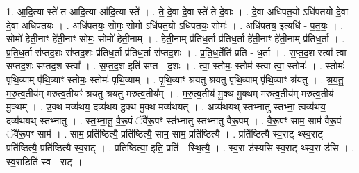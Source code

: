 \documentclass[17pt]{extarticle}
\begin{document}
1. आ॒दि॒त्या स्ते॑ त आदि॒त्या आ॑दि॒त्या स्ते᳚ । . ते॒ दे॒वा दे॒वा स्ते॑ ते दे॒वाः । . दे॒वा अधि॑पत॒यो ऽधि॑पतयो दे॒वा दे॒वा अधि॑पतयः । . अधि॑पतयः॒ सोमः॒ सोमो ऽधि॑पत॒यो ऽधि॑पतयः॒ सोमः॑ । . अधि॑पतय॒ इत्यधि॑ - प॒त॒यः॒ । . सोमो॑ हेती॒नाꣳ हे॑ती॒नाꣳ सोमः॒ सोमो॑ हेती॒नाम् । . हे॒ती॒नाम् प्र॑तिध॒र्ता प्र॑तिध॒र्ता हे॑ती॒नाꣳ हे॑ती॒नाम् प्र॑तिध॒र्ता । . प्र॒ति॒ध॒र्ता स॑प्तद॒शः स॑प्तद॒शः प्र॑तिध॒र्ता प्र॑तिध॒र्ता स॑प्तद॒शः । . प्र॒ति॒ध॒र्तेति॑ प्रति - ध॒र्ता । . स॒प्त॒द॒श स्त्वा᳚ त्वा सप्तद॒शः स॑प्तद॒श स्त्वा᳚ । . स॒प्त॒द॒श इति॑ सप्त - द॒शः । . त्वा॒ स्तोमः॒ स्तोम॑ स्त्वा त्वा॒ स्तोमः॑ । . स्तोमः॑ पृथि॒व्याम् पृ॑थि॒व्याꣳ स्तोमः॒ स्तोमः॑ पृथि॒व्याम् । . पृ॒थि॒व्याꣳ श्र॑यतु श्रयतु पृथि॒व्याम् पृ॑थि॒व्याꣳ श्र॑यतु । . श्र॒य॒तु॒ म॒रु॒त्व॒तीय॑म् मरुत्व॒तीयꣳ॑ श्रयतु श्रयतु मरुत्व॒तीय᳚म् । . म॒रु॒त्व॒तीय॑ मु॒क्थ मु॒क्थम् म॑रुत्व॒तीय॑म् मरुत्व॒तीय॑ मु॒क्थम् । . उ॒क्थ मव्य॑थय॒ दव्य॑थय दु॒क्थ मु॒क्थ मव्य॑थयत् । . अव्य॑थयथ् स्तभ्नातु स्तभ्ना॒ त्वव्य॑थय॒ दव्य॑थयथ् स्तभ्नातु । . स्त॒भ्ना॒तु॒ वै॒रू॒पं ॅवै॑रू॒पꣳ स्त॑भ्नातु स्तभ्नातु वैरू॒पम् । . वै॒रू॒पꣳ साम॒ साम॑ वैरू॒पं ॅवै॑रू॒पꣳ साम॑ । . साम॒ प्रति॑ष्ठित्यै॒ प्रति॑ष्ठित्यै॒ साम॒ साम॒ प्रति॑ष्ठित्यै । . प्रति॑ष्ठित्यै स्व॒राट् थ्स्व॒राट् प्रति॑ष्ठित्यै॒ प्रति॑ष्ठित्यै स्व॒राट् । . प्रति॑ष्ठित्या॒ इति॒ प्रति॑ - स्थि॒त्यै॒ । . स्व॒रा ड॑स्यसि स्व॒राट् थ्स्व॒रा ड॑सि । . स्व॒राडिति॑ स्व - राट् । \newline
\end{document}
